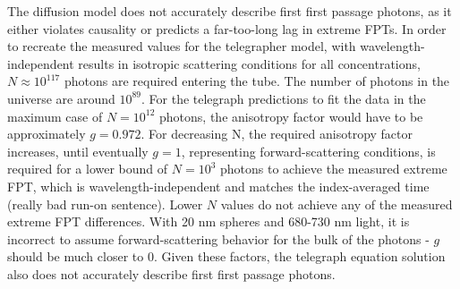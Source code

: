 \documentclass[floatfix,aps,prl,reprint,groupedaddress]{revtex4-2}
\begin{document}
The diffusion model does not accurately describe first first passage photons, as it either violates causality or predicts a far-too-long lag in extreme FPTs. In order to recreate the measured values for the telegrapher model, with wavelength-independent results in isotropic scattering conditions for all concentrations, $N \approx 10^{117}$ photons are required entering the tube. The number of photons in the universe are around $10^{89}$. For the telegraph predictions to fit the data in the maximum case of $N=10^{12}$ photons, the anisotropy factor would have to be approximately $g = 0.972$. For decreasing N, the required anisotropy factor increases, until eventually $g=1$, representing forward-scattering conditions, is required for a lower bound of $N=10^{3}$ photons to achieve the measured extreme FPT, which is wavelength-independent and matches the index-averaged time (really bad run-on sentence). Lower $N$ values do not achieve any of the measured extreme FPT differences. With 20 nm spheres and 680-730 nm light, it is incorrect to assume forward-scattering behavior for the bulk of the photons - $g$ should be much closer to 0. Given these factors, the telegraph equation solution also does not accurately describe first first passage photons.

\end{document}
